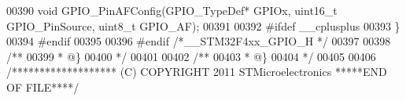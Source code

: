 \begin{DoxyCode}
00390 \textcolor{keywordtype}{void} GPIO_PinAFConfig(GPIO\_TypeDef* GPIOx, uint16\_t GPIO\_PinSource, uint8\_t GPIO\_AF);
00391 
00392 \textcolor{preprocessor}{#}\textcolor{preprocessor}{ifdef} \_\_cplusplus
00393 \}
00394 \textcolor{preprocessor}{#}\textcolor{preprocessor}{endif}
00395 
00396 \textcolor{preprocessor}{#}\textcolor{preprocessor}{endif} \textcolor{comment}{/*\_\_STM32F4xx\_GPIO\_H */}
00397 
00398 \textcolor{comment}{/**}
00399 \textcolor{comment}{  * @\}}
00400 \textcolor{comment}{  */}
00401 
00402 \textcolor{comment}{/**}
00403 \textcolor{comment}{  * @\}}
00404 \textcolor{comment}{  */}
00405 
00406 \textcolor{comment}{/******************* (C) COPYRIGHT 2011 STMicroelectronics *****END OF FILE****/}
\end{DoxyCode}
